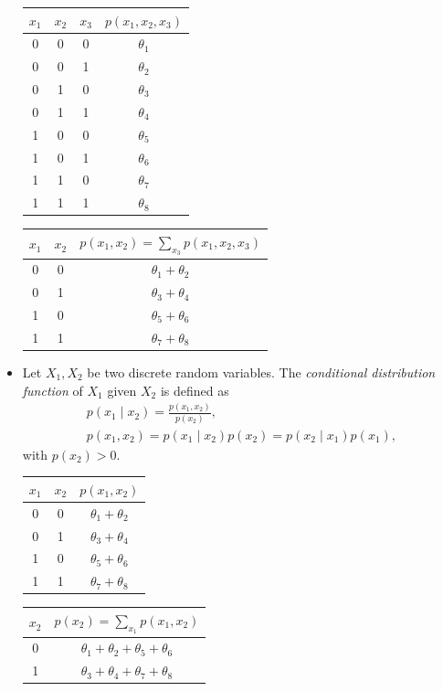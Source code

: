 \documentclass{tufte-handout}
\newcommand{\bmp}[1]{\begin{minipage}{#1}}
\newcommand{\emp}{\end{minipage}}
\newcommand{\tw}{\textwidth}
\begin{document}
\begin{itemize}
 \bmp{0.5\tw}
\begin{center}
\small
\begin{tabular}{ccc|c}
$x_1$ & $x_2$ & $x_3$ & $p(x_1, x_2,x_3)$\\
 \hline  0 & 0 & 0 & $\theta_1$\\ 
 0 & 0 & 1& $\theta_2$ \\  
 0 & 1 & 0 & $\theta_3$ \\  
 0 & 1 & 1 & $\theta_4$ \\ 
 1 & 0 & 0 & $\theta_5$\\
 1 & 0 & 1& $\theta_6$ \\ 
 1 & 1 & 0 & $\theta_7$ \\ 
 1 & 1 & 1 & $\theta_8$ \\ 
\end{tabular}
\end{center}
\emp
 \bmp{0.5\tw}
\begin{center}
\small
\begin{tabular}{cc|c}
$x_1$ & $x_2$ & $p(x_1, x_2)= \sum_{x_3}p(x_1, x_2,x_3)$\\
 \hline  0 & 0 & $\theta_1+\theta_2$\\ 
 0 & 1 & $\theta_3+\theta_4$ \\  
 1 & 0 & $\theta_5+\theta_6$\\
 1 & 1 & $\theta_7+\theta_8$ \\ 
\end{tabular}
\end{center}
\emp
  \vspace{0.5cm}
 \item   Let $X_1, X_2$ be two discrete random variables. The \textit{conditional distribution function} of $X_1$ given  $X_2$ is  defined as 
 \begin{align*}  
 p(x_1\mid x_2) = \frac{p(x_1,x_2)}{p(x_2)},\\
 p(x_1,x_2) =  p(x_1\mid x_2)p(x_2) = p(x_2\mid x_1)p(x_1), 
 \end{align*} 
 with $p(x_2)> 0$.
 
 \vspace{0.5cm}
 \bmp{0.5\tw}
\begin{center}
\small
\begin{tabular}{cc|c}
$x_1$ & $x_2$ & $p(x_1, x_2)$\\
 \hline  0 & 0 & $\theta_1+\theta_2$\\ 
 0 & 1 & $\theta_3+\theta_4$ \\  
 1 & 0 & $\theta_5+\theta_6$\\
 1 & 1 & $\theta_7+\theta_8$ \\ 
\end{tabular}
\end{center}
\emp
\bmp{0.5\tw}
\begin{center}
\small
\begin{tabular}{c|c}
 $x_2$ &$p(x_2)= \sum_{x_1}p(x_1, x_2)$\\
 \hline  0 &  $\theta_1+\theta_2+\theta_5+\theta_6$\\ 
 1 & $\theta_3+\theta_4+\theta_7+\theta_8$ \\  
\end{tabular}
\end{center}
\emp


\end{itemize}
\end{document}
